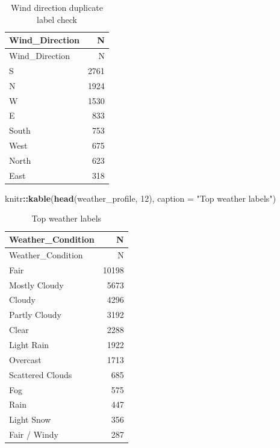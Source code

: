 \documentclass[
]{article}
\newenvironment{Shaded}{\begin{snugshade}}{\end{snugshade}}
\newcommand{\AttributeTok}[1]{\textcolor[rgb]{0.13,0.29,0.53}{#1}}
\newcommand{\DecValTok}[1]{\textcolor[rgb]{0.00,0.00,0.81}{#1}}
\newcommand{\FunctionTok}[1]{\textcolor[rgb]{0.13,0.29,0.53}{\textbf{#1}}}
\newcommand{\NormalTok}[1]{#1}
\newcommand{\SpecialCharTok}[1]{\textcolor[rgb]{0.81,0.36,0.00}{\textbf{#1}}}
\newcommand{\StringTok}[1]{\textcolor[rgb]{0.31,0.60,0.02}{#1}}
\begin{document}
\begin{longtable}[]{@{}lr@{}}
\caption{Wind direction duplicate label check}\tabularnewline
\toprule\noalign{}
Wind\_Direction & N \\
\midrule\noalign{}
\endfirsthead
\toprule\noalign{}
Wind\_Direction & N \\
\midrule\noalign{}
\endhead
\bottomrule\noalign{}
\endlastfoot
S & 2761 \\
N & 1924 \\
W & 1530 \\
E & 833 \\
South & 753 \\
West & 675 \\
North & 623 \\
East & 318 \\
\end{longtable}

\begin{Shaded}
\begin{Highlighting}[]
\NormalTok{knitr}\SpecialCharTok{::}\FunctionTok{kable}\NormalTok{(}\FunctionTok{head}\NormalTok{(weather\_profile, }\DecValTok{12}\NormalTok{), }\AttributeTok{caption =} \StringTok{"Top weather labels"}\NormalTok{)}
\end{Highlighting}
\end{Shaded}

\begin{longtable}[]{@{}lr@{}}
\caption{Top weather labels}\tabularnewline
\toprule\noalign{}
Weather\_Condition & N \\
\midrule\noalign{}
\endfirsthead
\toprule\noalign{}
Weather\_Condition & N \\
\midrule\noalign{}
\endhead
\bottomrule\noalign{}
\endlastfoot
Fair & 10198 \\
Mostly Cloudy & 5673 \\
Cloudy & 4296 \\
Partly Cloudy & 3192 \\
Clear & 2288 \\
Light Rain & 1922 \\
Overcast & 1713 \\
Scattered Clouds & 685 \\
Fog & 575 \\
Rain & 447 \\
Light Snow & 356 \\
Fair / Windy & 287 \\
\end{longtable}
\end{document}
